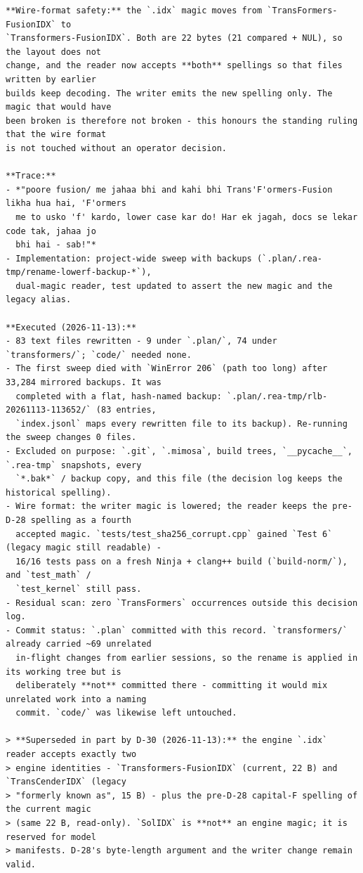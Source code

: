 \begin{verbatim}
**Wire-format safety:** the `.idx` magic moves from `TransFormers-FusionIDX` to
`Transformers-FusionIDX`. Both are 22 bytes (21 compared + NUL), so the layout does not
change, and the reader now accepts **both** spellings so that files written by earlier
builds keep decoding. The writer emits the new spelling only. The magic that would have
been broken is therefore not broken - this honours the standing ruling that the wire format
is not touched without an operator decision.

**Trace:**
- *"poore fusion/ me jahaa bhi and kahi bhi Trans'F'ormers-Fusion likha hua hai, 'F'ormers
  me to usko 'f' kardo, lower case kar do! Har ek jagah, docs se lekar code tak, jahaa jo
  bhi hai - sab!"*
- Implementation: project-wide sweep with backups (`.plan/.rea-tmp/rename-lowerf-backup-*`),
  dual-magic reader, test updated to assert the new magic and the legacy alias.

**Executed (2026-11-13):**
- 83 text files rewritten - 9 under `.plan/`, 74 under `transformers/`; `code/` needed none.
- The first sweep died with `WinError 206` (path too long) after 33,284 mirrored backups. It was
  completed with a flat, hash-named backup: `.plan/.rea-tmp/rlb-20261113-113652/` (83 entries,
  `index.jsonl` maps every rewritten file to its backup). Re-running the sweep changes 0 files.
- Excluded on purpose: `.git`, `.mimosa`, build trees, `__pycache__`, `.rea-tmp` snapshots, every
  `*.bak*` / backup copy, and this file (the decision log keeps the historical spelling).
- Wire format: the writer magic is lowered; the reader keeps the pre-D-28 spelling as a fourth
  accepted magic. `tests/test_sha256_corrupt.cpp` gained `Test 6` (legacy magic still readable) -
  16/16 tests pass on a fresh Ninja + clang++ build (`build-norm/`), and `test_math` /
  `test_kernel` still pass.
- Residual scan: zero `TransFormers` occurrences outside this decision log.
- Commit status: `.plan` committed with this record. `transformers/` already carried ~69 unrelated
  in-flight changes from earlier sessions, so the rename is applied in its working tree but is
  deliberately **not** committed there - committing it would mix unrelated work into a naming
  commit. `code/` was likewise left untouched.

> **Superseded in part by D-30 (2026-11-13):** the engine `.idx` reader accepts exactly two
> engine identities - `Transformers-FusionIDX` (current, 22 B) and `TransCenderIDX` (legacy
> "formerly known as", 15 B) - plus the pre-D-28 capital-F spelling of the current magic
> (same 22 B, read-only). `SolIDX` is **not** an engine magic; it is reserved for model
> manifests. D-28's byte-length argument and the writer change remain valid.



\end{verbatim}
